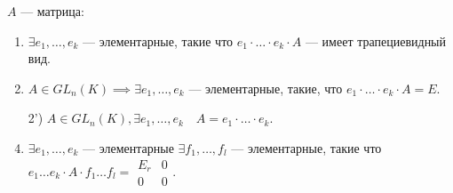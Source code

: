 \begin{theorem}
    $A$ --- матрица:
     \begin{enumerate}
         \item $\exists e_1, \ldots, e_k$ --- элементарные, такие что $e_1 \cdot \ldots \cdot e_k \cdot A$ --- имеет трапециевидный вид. 
         \item $A \in GL_n(K) \implies \exists e_1, \ldots, e_k$ --- элементарные, такие, что $e_1 \cdot \ldots \cdot e_k \cdot A = E$.
         \item[2')] $A \in GL_n(K), \exists e_1, \ldots, e_k \quad A=e_1 \cdot \ldots \cdot e_k$.
         \item $\exists e_1, \ldots, e_k$ --- элементарные $\exists f_1,\ldots, f_l$ --- элементарные, такие что $e_1 \ldots e_k \cdot A \cdot f_1 \ldots f_l = \begin{array}{|c|c|} E_r & 0 \\ \hline 0 & 0 \end{array}$.
    \end{enumerate}
\end{theorem}
